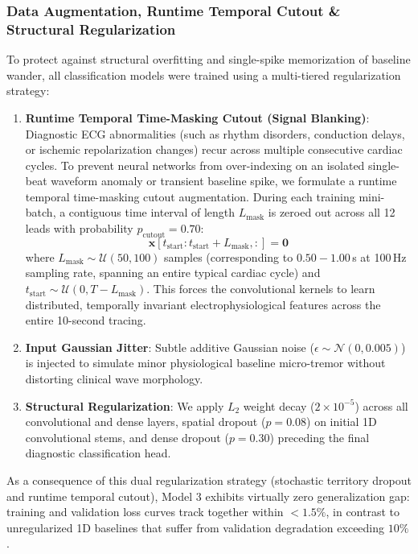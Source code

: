 \documentclass[5p,twocolumn,10pt]{elsarticle}
\begin{document}
\subsubsection{Data Augmentation, Runtime Temporal Cutout \& Structural Regularization}
\label{sec:cutout_regularization}
To protect against structural overfitting and single-spike memorization of baseline wander, all classification models were trained using a multi-tiered regularization strategy:
\begin{enumerate}
    \item \textbf{Runtime Temporal Time-Masking Cutout (Signal Blanking)}: Diagnostic ECG abnormalities (such as rhythm disorders, conduction delays, or ischemic repolarization changes) recur across multiple consecutive cardiac cycles. To prevent neural networks from over-indexing on an isolated single-beat waveform anomaly or transient baseline spike, we formulate a runtime temporal time-masking cutout augmentation. During each training mini-batch, a contiguous time interval of length $L_{\text{mask}}$ is zeroed out across all 12 leads with probability $p_{\text{cutout}} = 0.70$:
    \begin{equation}
    \mathbf{x}[t_{\text{start}} : t_{\text{start}} + L_{\text{mask}}, :] = \mathbf{0}
    \end{equation}
    where $L_{\text{mask}} \sim \mathcal{U}(50, 100)$ samples (corresponding to $0.50 - 1.00$\,s at 100\,Hz sampling rate, spanning an entire typical cardiac cycle) and $t_{\text{start}} \sim \mathcal{U}(0, T - L_{\text{mask}})$. This forces the convolutional kernels to learn distributed, temporally invariant electrophysiological features across the entire 10-second tracing.
    \item \textbf{Input Gaussian Jitter}: Subtle additive Gaussian noise ($\epsilon \sim \mathcal{N}(0, 0.005)$) is injected to simulate minor physiological baseline micro-tremor without distorting clinical wave morphology.
    \item \textbf{Structural Regularization}: We apply $L_2$ weight decay ($2 \times 10^{-5}$) across all convolutional and dense layers, spatial dropout ($p = 0.08$) on initial 1D convolutional stems, and dense dropout ($p = 0.30$) preceding the final diagnostic classification head.
\end{enumerate}
As a consequence of this dual regularization strategy (stochastic territory dropout and runtime temporal cutout), Model 3 exhibits virtually zero generalization gap: training and validation loss curves track together within $<1.5\%$, in contrast to unregularized 1D baselines that suffer from validation degradation exceeding $10\%$.
\end{document}

